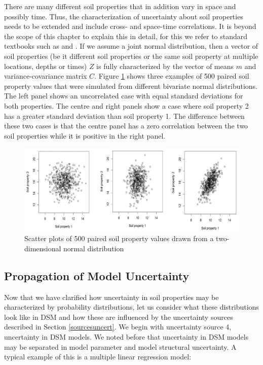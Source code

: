 \documentclass[10pt,b5paper,]{book}
\theoremstyle{definition}
\theoremstyle{definition}
\theoremstyle{definition}
\theoremstyle{remark}
\begin{document}
There are many different soil properties that in addition vary in space
and possibly time. Thus, the characterization of uncertainty about soil
properties needs to be extended and include cross- and space-time
correlations. It is beyond the scope of this chapter to explain this in
detail, for this we refer to standard textbooks such as
\cite{goovaerts1997geostatistics} and \cite{webster_2007}. If we assume
a joint normal distribution, then a vector of soil properties (be it
different soil properties or the same soil property at multiple
locations, depths or times) \(Z\) is fully characterized by the vector
of means \(m\) and variance-covariance matrix \(C\). Figure
\ref{fig:pairedsoils} shows three examples of 500 paired soil property
values that were simulated from different bivariate normal
distributions. The left panel shows an uncorrelated case with equal
standard deviations for both properties. The centre and right panels
show a case where soil property 2 has a greater standard deviation than
soil property 1. The difference between these two cases is that the
centre panel has a zero correlation between the two soil properties
while it is positive in the right panel.

\begin{figure}
\includegraphics[width=0.8\linewidth]{images/pairedsoilpropierties} \caption{Scatter plots of 500 paired soil property values drawn from a two-dimensional normal distribution}\label{fig:pairedsoils}
\end{figure}

\hypertarget{propagation-of-model-uncertainty}{%
\subsection{Propagation of Model
Uncertainty}\label{propagation-of-model-uncertainty}}

Now that we have clarified how uncertainty in soil properties may be
characterized by probability distributions, let us consider what these
distributions look like in DSM and how these are influenced by the
uncertainty sources described in Section \ref{sourcesuncert}. We begin
with uncertainty source 4, uncertainty in DSM models. We noted before
that uncertainty in DSM models may be separated in model parameter and
model structural uncertainty. A typical example of this is a multiple
linear regression model:
\end{document}
